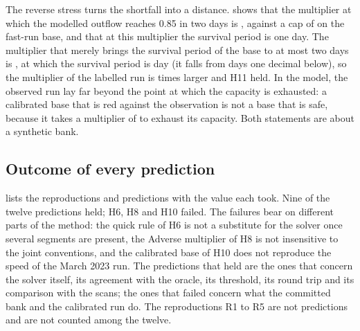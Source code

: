 The reverse stress turns the shortfall into a distance.  shows that the multiplier at which the modelled outflow reaches 0.85 in two days is \mSvb{}, against a cap of \capFast{} on the fast-run base, and that at this multiplier the survival period is one day. The multiplier that merely brings the survival period of the base to at most two days is \mTwo{}, at which the survival period is \spAtTwo{} day (it falls from \spBelowTwo{} days one decimal below), so the multiplier of the labelled run is \ratioLab{} times larger and H11 held. In the model, the observed run lay far beyond the point at which the capacity is exhausted: a calibrated base that is red against the observation is not a base that is safe, because it takes a multiplier of \mTwo{} to exhaust its capacity. Both statements are about a synthetic bank.

\subsection{Outcome of every prediction}



 lists the reproductions and predictions with the value each took. Nine of the twelve predictions held; H6, H8 and H10 failed. The failures bear on different parts of the method: the quick rule of H6 is not a substitute for the solver once several segments are present, the Adverse multiplier of H8 is not insensitive to the joint conventions, and the calibrated base of H10 does not reproduce the speed of the March 2023 run. The predictions that held are the ones that concern the solver itself, its agreement with the oracle, its threshold, its round trip and its comparison with the scans; the ones that failed concern what the committed bank and the calibrated run do. The reproductions R1 to R5 are not predictions and are not counted among the twelve.
